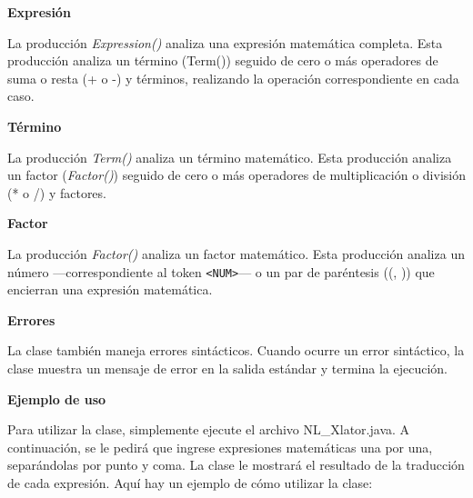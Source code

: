 \phantom{text}

\noindent \textbf{Expresión}

\phantom{text}

\lstset{inputencoding=utf8/latin1}


\noindent La producción \textit{Expression()} analiza una expresión matemática completa. Esta producción analiza un término (Term()) seguido de cero o más operadores de suma o resta (+ o -) y términos, realizando la operación correspondiente en cada caso.

\phantom{text}

\noindent \textbf{Término}

\phantom{text}

\lstset{inputencoding=utf8/latin1}


\noindent La producción \textit{Term()} analiza un término matemático. Esta producción analiza un factor (\textit{Factor()}) seguido de cero o más operadores de multiplicación o división (* o /) y factores.

\phantom{text}

\noindent \textbf{Factor}

\phantom{text}

\lstset{inputencoding=utf8/latin1}


\noindent La producción \textit{Factor()} analiza un factor matemático. Esta producción analiza un número ---correspondiente al token  \lstinline|<NUM>|--- o un par de paréntesis ((, )) que encierran una expresión matemática.

\phantom{text}

\noindent \textbf{Errores}

\phantom{text}

\noindent La clase también maneja errores sintácticos. Cuando ocurre un error sintáctico, la clase muestra un mensaje de error en la salida estándar y termina la ejecución.

\phantom{text}

\noindent \textbf{Ejemplo de uso}

\phantom{text}

\noindent Para utilizar la clase, simplemente ejecute el archivo NL\_Xlator.java. A continuación, se le pedirá que ingrese expresiones matemáticas una por una, separándolas por punto y coma. La clase le mostrará el resultado de la traducción de cada expresión.
Aquí hay un ejemplo de cómo utilizar la clase:

